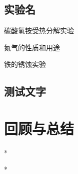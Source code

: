 \documentclass[color=BLUE]{textbook-cn}%
\begin{document}
\begin{Project}
\section{实验名}
\begin{Point}
\lipsum[2]
\end{Point}

\begin{Case}
\item 碳酸氢铵受热分解实验
\item 氮气的性质和用途
\item 铁的锈蚀实验
\end{Case}

\subsection{测试文字}
\lipsum
\begin{Definition}[定理名称]
\lipsum[1]
\end{Definition}

\begin{Lemma}[引理名称]
\lipsum[1]
\end{Lemma}
\end{Project}



\section{回顾与总结}
\begin{Point}*
\lipsum[1]
\end{Point}

\begin{Case}*
\item \lipsum[1][1]
\item \lipsum[1][1]
\item \lipsum[1][1]
\item \lipsum[1][1]
\item \lipsum[1][1]
\item \lipsum[1][1]
\item \lipsum[1][1]
\end{Case}
\end{document}
